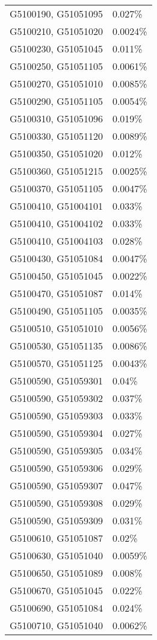 \begin{longtable}[]{@{}ll@{}}
G5100190, G51051095 & 0.027\% \\
G5100210, G51051020 & 0.0024\% \\
G5100230, G51051045 & 0.011\% \\
G5100250, G51051105 & 0.0061\% \\
G5100270, G51051010 & 0.0085\% \\
G5100290, G51051105 & 0.0054\% \\
G5100310, G51051096 & 0.019\% \\
G5100330, G51051120 & 0.0089\% \\
G5100350, G51051020 & 0.012\% \\
G5100360, G51051215 & 0.0025\% \\
G5100370, G51051105 & 0.0047\% \\
G5100410, G51004101 & 0.033\% \\
G5100410, G51004102 & 0.033\% \\
G5100410, G51004103 & 0.028\% \\
G5100430, G51051084 & 0.0047\% \\
G5100450, G51051045 & 0.0022\% \\
G5100470, G51051087 & 0.014\% \\
G5100490, G51051105 & 0.0035\% \\
G5100510, G51051010 & 0.0056\% \\
G5100530, G51051135 & 0.0086\% \\
G5100570, G51051125 & 0.0043\% \\
G5100590, G51059301 & 0.04\% \\
G5100590, G51059302 & 0.037\% \\
G5100590, G51059303 & 0.033\% \\
G5100590, G51059304 & 0.027\% \\
G5100590, G51059305 & 0.034\% \\
G5100590, G51059306 & 0.029\% \\
G5100590, G51059307 & 0.047\% \\
G5100590, G51059308 & 0.029\% \\
G5100590, G51059309 & 0.031\% \\
G5100610, G51051087 & 0.02\% \\
G5100630, G51051040 & 0.0059\% \\
G5100650, G51051089 & 0.008\% \\
G5100670, G51051045 & 0.022\% \\
G5100690, G51051084 & 0.024\% \\
G5100710, G51051040 & 0.0062\% \\

\end{longtable}

